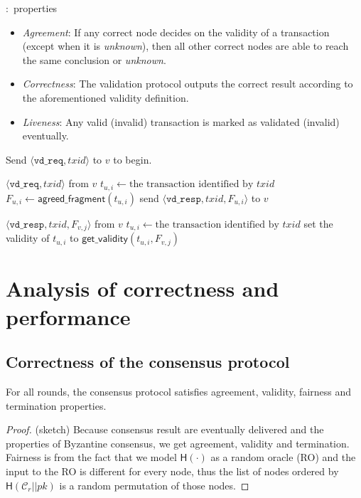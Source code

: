 \documentclass{beamer}
\newcommand{\C}{\mathcal{C}}
\begin{document}
\begin{frame}{\subsecname:~properties}
\begin{itemize}
    \item \emph{Agreement}:
        If any correct node decides on the validity of a transaction (except when it is \emph{unknown}),
        then all other correct nodes are able to reach the same conclusion or \emph{unknown}.
    \item \emph{Correctness}:
        The validation protocol outputs the correct result
        according to the aforementioned validity definition.
    \item \emph{Liveness}:
        Any valid (invalid) transaction is marked as validated (invalid) eventually.
\end{itemize}
\end{frame}

\begin{frame}{\subsecname}
Send $\langle \texttt{vd\_req}, txid \rangle$ to $v$ to begin.
\vspace{5 mm}
\begin{algorithmic}
    \Upon $\langle \texttt{vd\_req}, txid \rangle$ from $v$
        \State $t_{u, i} \gets \text{the transaction identified by } txid$
        \State $F_{u, i} \gets \textsf{agreed\_fragment}(t_{u, i})$
        \State send $\langle \texttt{vd\_resp}, txid, F_{u, i} \rangle$ to $v$

    \Upon $\langle \texttt{vd\_resp}, txid, F_{v, j} \rangle$ from $v$
        \State $t_{u, i} \gets \text{the transaction identified by } txid$
        \State set the validity of $t_{u, i}$ to $\textsf{get\_validity}(t_{u, i}, F_{v, j})$
\end{algorithmic}
\end{frame}

\section{Analysis of correctness and performance}

\subsection{Correctness of the consensus protocol}
\begin{frame}{\subsecname}
\begin{theorem}
For all rounds,
the consensus protocol satisfies agreement, validity, fairness and termination properties.
\end{theorem}
\begin{proof}(sketch)
Because consensus result are eventually delivered and the properties of Byzantine consensus,
we get agreement, validity and termination.
Fairness is from the fact that we model $\textsf{H}(\cdot)$ as a random oracle (RO) and the input to the RO is different for every node,
thus the list of nodes ordered by $\textsf{H}(\C_r || pk )$ is a random permutation of those nodes.
\end{proof}
\end{frame}
\end{document}

